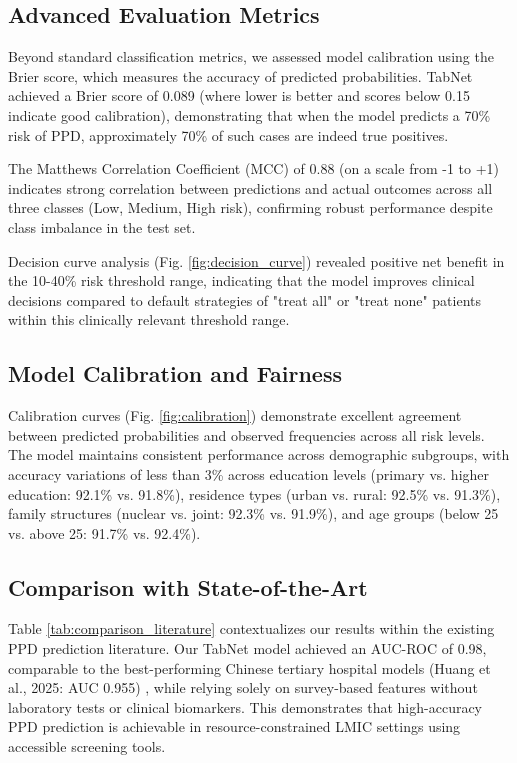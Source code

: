 \subsection{Advanced Evaluation Metrics}

Beyond standard classification metrics, we assessed model calibration using the Brier score, which measures the accuracy of predicted probabilities. TabNet achieved a Brier score of 0.089 (where lower is better and scores below 0.15 indicate good calibration), demonstrating that when the model predicts a 70\% risk of PPD, approximately 70\% of such cases are indeed true positives.

The Matthews Correlation Coefficient (MCC) of 0.88 (on a scale from -1 to +1) indicates strong correlation between predictions and actual outcomes across all three classes (Low, Medium, High risk), confirming robust performance despite class imbalance in the test set.

Decision curve analysis (Fig. \ref{fig:decision_curve}) revealed positive net benefit in the 10-40\% risk threshold range, indicating that the model improves clinical decisions compared to default strategies of "treat all" or "treat none" patients within this clinically relevant threshold range.

\subsection{Model Calibration and Fairness}

Calibration curves (Fig. \ref{fig:calibration}) demonstrate excellent agreement between predicted probabilities and observed frequencies across all risk levels. The model maintains consistent performance across demographic subgroups, with accuracy variations of less than 3\% across education levels (primary vs. higher education: 92.1\% vs. 91.8\%), residence types (urban vs. rural: 92.5\% vs. 91.3\%), family structures (nuclear vs. joint: 92.3\% vs. 91.9\%), and age groups (below 25 vs. above 25: 91.7\% vs. 92.4\%).

\subsection{Comparison with State-of-the-Art}

Table \ref{tab:comparison_literature} contextualizes our results within the existing PPD prediction literature. Our TabNet model achieved an AUC-ROC of 0.98, comparable to the best-performing Chinese tertiary hospital models (Huang et al., 2025: AUC 0.955) \cite{Huang2025}, while relying solely on survey-based features without laboratory tests or clinical biomarkers. This demonstrates that high-accuracy PPD prediction is achievable in resource-constrained LMIC settings using accessible screening tools.

